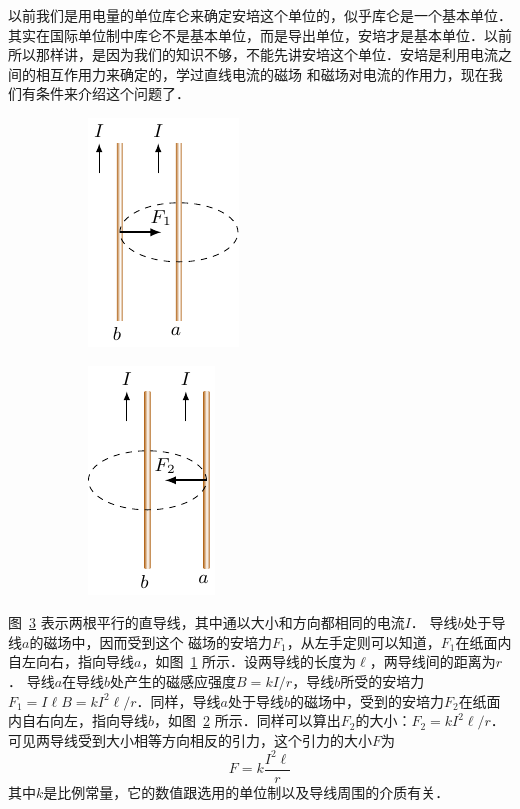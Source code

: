 以前我们是用电量的单位库仑来确定安培这个单位的，似乎库仑是一个基本单位．其实在国际单位制中库仑不是基本单位，而是导出单位，安培才是基本单位．以前所以那样讲，是因为我们的知识不够，不能先讲安培这个单位．安培是利用电流之间的相互作用力来确定的，学过直线电流的磁场
和磁场对电流的作用力，现在我们有条件来介绍这个问题了．
\begin{figure}[htbp]
    \centering
    \begin{subfigure}{0.4\linewidth}
        \centering
        \includegraphics{fig/C/1-23a.pdf}
        \caption{}\label{fig_C_1-23a}
    \end{subfigure}
    \hfil
    \begin{subfigure}{0.4\linewidth}
        \centering
        \includegraphics{fig/C/1-23b.pdf}
        \caption{}\label{fig_C_1-23b}
    \end{subfigure}
    \caption{}\label{fig_C_1-23}
\end{figure}

图~\ref{fig_C_1-23} 表示两根平行的直导线，其中通以大小和方向都相同的电流$I$．
导线$b$处于导线$a$的磁场中，因而受到这个
磁场的安培力$F_1$，从左手定则可以知道，$F_1$在纸面内自左向右，指向导线$a$，如图~\ref{fig_C_1-23a} 所示．设两导线的长度为$\ell$，两导线间的距离为$r$．
导线$a$在导线$b$处产生的磁感应强度$B=kI/r$，导线$b$所受的安培力$F_1=I\ell B=kI^2\ell/r$．同样，导线$a$处于导线$b$的磁场中，受到的安培力$F_2$在纸面内自右向左，指向导线$b$，如图~\ref{fig_C_1-23b} 所示．同样可以算出$F_2$的大小：$F_2=kI^2\ell/r$．可见两导线受到大小相等方向相反的引力，这个引力的大小$F$为
\[F=k\frac{I^2\ell}{r}\]
其中$k$是比例常量，它的数值跟选用的单位制以及导线周围的介质有关．

